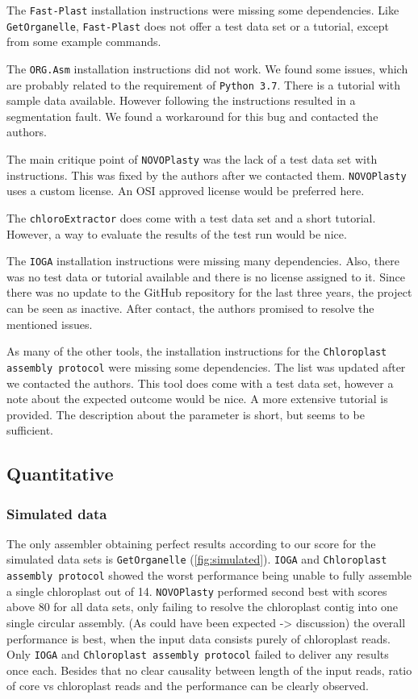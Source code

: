 \documentclass{bmcart}
\newcommand{\formatprogramnames}[1]{\texttt{#1}}
\newcommand{\ce}{\formatprogramnames{chloroExtractor}}
\newcommand{\oa}{\formatprogramnames{ORG.Asm}}
\newcommand{\fp}{\formatprogramnames{Fast-Plast}}
\newcommand{\ioga}{\formatprogramnames{IOGA}}
\newcommand{\np}{\formatprogramnames{NOVOPlasty}}
\newcommand{\go}{\formatprogramnames{GetOrganelle}}
\newcommand{\cassp}{\formatprogramnames{Chloroplast assembly protocol}}
\begin{document}
The \fp{} installation instructions were missing some dependencies. Like \go{}, \fp{} does not offer a test data set or a tutorial, except from some example commands. 

The \oa{} installation instructions did not work. We found some issues, which are probably related to the requirement of \texttt{Python~3.7}. There is a tutorial with sample data available. However following the instructions resulted in a segmentation fault. We found a workaround for this bug and contacted the authors.

The main critique point of \np{} was the lack of a test data set with instructions. This was fixed by the authors after we contacted them. \np{} uses a custom license. An OSI approved license would be preferred here.

The \ce{} does come with a test data set and a short tutorial. However, a way to evaluate the results of the test run would be nice.

The \ioga{} installation instructions were missing many dependencies. Also, there was no test data or tutorial available and there is no license assigned to it. Since there was no update to the GitHub repository for the last three years, the project can be seen as inactive. After contact, the authors promised to resolve the mentioned issues.

As many of the other tools, the installation instructions for the \cassp{} were missing some dependencies. The list was updated after we contacted the authors. This tool does come with a test data set, however a note about the expected outcome would be nice. A more extensive tutorial is provided. The description about the parameter is short, but seems to be sufficient.

\subsection*{Quantitative}
\subsubsection*{Simulated data}
The only assembler obtaining perfect results according to our score for the simulated data sets is \go{} (\cref{fig:simulated}).
\ioga{} and \cassp{} showed the worst performance being unable to fully assemble a single chloroplast out of \num{14}.
\np{} performed second best with scores above \num{80} for all data sets, only failing to resolve the chloroplast contig into one single circular assembly.
(As could have been expected -> discussion) the overall performance is best, when the input data consists purely of chloroplast reads.
Only \ioga{} and \cassp{} failed to deliver any results once each.
Besides that no clear causality between length of the input reads, ratio of core vs chloroplast reads and the performance can be clearly observed. 
\end{document}
